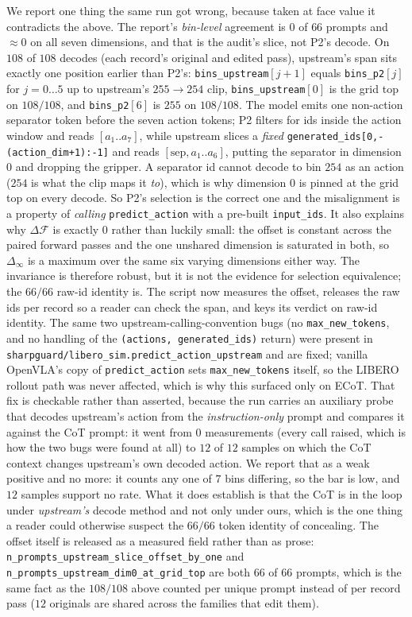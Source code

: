 \documentclass{article}
\begin{document}
We report one thing the same run got wrong, because taken at face value it contradicts the above. The report's \emph{bin-level} agreement is $0$ of $66$ prompts and ${\approx}0$ on all seven dimensions, and that is the audit's slice, not P2's decode. On $108$ of $108$ decodes (each record's original and edited pass), upstream's span sits exactly one position earlier than P2's: \texttt{bins\_upstream}$[j{+}1]$ equals \texttt{bins\_p2}$[j]$ for $j{=}0\ldots5$ up to upstream's $255{\to}254$ clip, \texttt{bins\_upstream}$[0]$ is the grid top on $108/108$, and \texttt{bins\_p2}$[6]$ is $255$ on $108/108$. The model emits one non-action separator token before the seven action tokens; P2 filters for ids inside the action window and reads $[a_1..a_7]$, while upstream slices a \emph{fixed} \texttt{generated\_ids[0,-(action\_dim+1):-1]} and reads $[\textrm{sep},a_1..a_6]$, putting the separator in dimension $0$ and dropping the gripper. A separator id cannot decode to bin $254$ as an action ($254$ is what the clip maps it \emph{to}), which is why dimension $0$ is pinned at the grid top on every decode. So P2's selection is the correct one and the misalignment is a property of \emph{calling} \texttt{predict\_action} with a pre-built \texttt{input\_ids}. It also explains why $\Delta\mathcal{F}$ is exactly $0$ rather than luckily small: the offset is constant across the paired forward passes and the one unshared dimension is saturated in both, so $\Delta_\infty$ is a maximum over the same six varying dimensions either way. The invariance is therefore robust, but it is not the evidence for selection equivalence; the $66/66$ raw-id identity is. The script now measures the offset, releases the raw ids per record so a reader can check the span, and keys its verdict on raw-id identity. The same two upstream-calling-convention bugs (no \texttt{max\_new\_tokens}, and no handling of the \texttt{(actions, generated\_ids)} return) were present in \texttt{sharpguard/libero\_sim.predict\_action\_upstream} and are fixed; vanilla OpenVLA's copy of \texttt{predict\_action} sets \texttt{max\_new\_tokens} itself, so the LIBERO rollout path was never affected, which is why this surfaced only on ECoT. That fix is checkable rather than asserted, because the run carries an auxiliary probe that decodes upstream's action from the \emph{instruction-only} prompt and compares it against the CoT prompt: it went from $0$ measurements (every call raised, which is how the two bugs were found at all) to $12$ of $12$ samples on which the CoT context changes upstream's own decoded action. We report that as a weak positive and no more: it counts any one of $7$ bins differing, so the bar is low, and $12$ samples support no rate. What it does establish is that the CoT is in the loop under \emph{upstream's} decode method and not only under ours, which is the one thing a reader could otherwise suspect the $66/66$ token identity of concealing. The offset itself is released as a measured field rather than as prose: \texttt{n\_prompts\_upstream\_slice\_offset\_by\_one} and \texttt{n\_prompts\_upstream\_dim0\_at\_grid\_top} are both $66$ of $66$ prompts, which is the same fact as the $108/108$ above counted per unique prompt instead of per record pass ($12$ originals are shared across the families that edit them).
\end{document}
